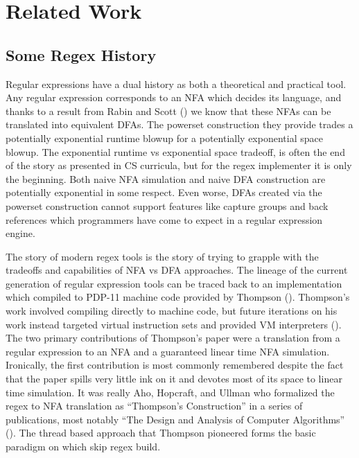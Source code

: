 \chapter{Related Work}
\label{chapter:relatedwork}

\section{Some Regex History}

Regular expressions have a dual history as both a theoretical
and practical tool. Any regular expression corresponds to an
NFA which decides its language, and thanks to a
result from Rabin and Scott (\cite{Rabin1959}) we know that
these NFAs can be translated into equivalent DFAs. The powerset
construction they provide trades a potentially exponential runtime
blowup for a potentially exponential space blowup.
The exponential runtime vs exponential space tradeoff,
is often the end of the story as presented in CS curricula,
but for the regex implementer it is only the beginning. Both
naive NFA simulation and naive DFA construction are potentially exponential
in some respect. Even worse, DFAs created via the powerset construction
cannot support features like capture groups and back references 
which programmers have come to expect in a regular expression engine.

The story of modern regex tools is the story of trying to grapple
with the tradeoffs and capabilities of NFA vs DFA approaches.
The lineage of the current generation of regular expression tools
can be traced back to an implementation which compiled
to PDP-11 machine code provided by Thompson (\cite{Thompson1968}).
Thompson's work involved compiling directly to machine code, but
future iterations on his work instead targeted virtual instruction
sets and provided VM interpreters (\cite{CoxVirtualMachineApproach}).
The two primary contributions of Thompson's paper were a translation
from a regular expression to an NFA and a guaranteed linear time
NFA simulation. Ironically, the first contribution is most commonly 
remembered despite the fact that the paper spills very little ink
on it and devotes most of its space to linear time simulation.
It was really Aho, Hopcraft, and Ullman who formalized the regex to NFA
translation as ``Thompson's Construction'' in a series of 
publications, most notably ``The Design and Analysis of Computer Algorithms''
(\cite{Aho1974}). The thread based approach that Thompson pioneered
forms the basic paradigm on which skip regex build.

